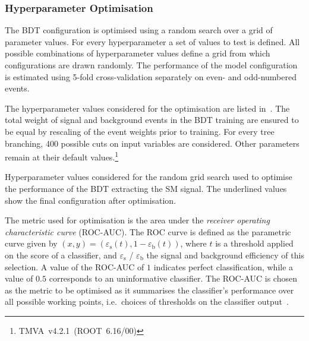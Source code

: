 \subsubsection{Hyperparameter Optimisation}

The BDT configuration is optimised using a random search over a grid
of parameter values. For every hyperparameter a set of values to test
is defined. All possible combinations of hyperparameter values define
a grid from which configurations are drawn randomly. The performance
of the model configuration is estimated using 5-fold cross-validation
separately on even- and odd-numbered events.

The hyperparameter values considered for the optimisation are listed
in~. The total
weight of signal and background events in the BDT training are ensured to be
equal by rescaling of the event weights prior to training.
For every tree branching, 400 possible cuts on input variables are
considered. Other parameters remain at their default
values.\footnote{TMVA~v4.2.1~(ROOT~6.16/00)}

\begin{table}[htbp]
  \centering

  \caption[Hyperparameter values of the BDT extracting the SM~\HH signal in the
  \hadhad channel.]{Hyperparameter values considered for the random grid search
    used to optimise the performance of the BDT extracting the SM \HH
    signal. The underlined values show the final configuration after
    optimisation.}%
  \label{tab:hyperparameter_grid_bdt}

  
\end{table}

The metric used for optimisation is the area under the \emph{receiver
  operating characteristic curve} (ROC-AUC). The ROC curve is defined
as the parametric curve given by
$(x, y) = \left( \varepsilon_{\text{s}}(t), 1 -
  \varepsilon_{\text{b}}(t) \right)$, where $t$ is a threshold applied
on the score of a classifier, and $\varepsilon_\text{s}$ /
$\varepsilon_\text{b}$ the signal and background efficiency of this
selection. A value of the ROC-AUC of $1$ indicates perfect
classification, while a value of $0.5$ corresponds to an uninformative
classifier. The ROC-AUC is chosen as the metric to be optimised as it
summarises the classifier's performance over all possible working
points, i.e.\ choices of thresholds on the classifier
output~\cite{james13}.

